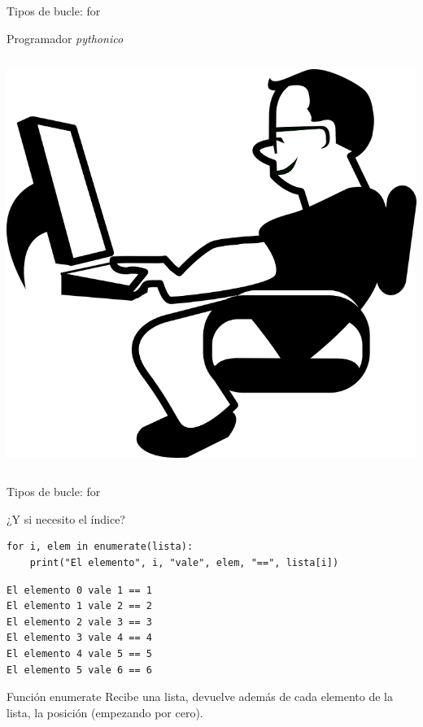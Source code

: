 \documentclass[bigger,unknownkeysallowed]{beamer}
\begin{document}
\begin{frame}[fragile,label={sec:org4d41cb9}]{Tipos de bucle: for}
\begin{block}{Programador \emph{pythonico}}
\begin{columns}
\begin{column}{0.3\columnwidth}
\begin{center}
\begin{center}
\includegraphics[width=.6\textwidth]{workingrelaxed.png}
\end{center}
\end{center}
\end{column}
\end{columns}
\end{block}
\end{frame}

\begin{frame}[fragile,label={sec:org6ac0d9c}]{Tipos de bucle: for}
 \begin{exampleblock}{¿Y si necesito el índice?}
\begin{verbatim}
for i, elem in enumerate(lista):
    print("El elemento", i, "vale", elem, "==", lista[i])
\end{verbatim}
\scriptsize
\begin{verbatim}
El elemento 0 vale 1 == 1
El elemento 1 vale 2 == 2
El elemento 2 vale 3 == 3
El elemento 3 vale 4 == 4
El elemento 4 vale 5 == 5
El elemento 5 vale 6 == 6
\end{verbatim}
\end{exampleblock}

\begin{block}{Función enumerate}
Recibe una lista, devuelve además de cada elemento de la lista, la posición (empezando por cero).
\end{block}
\end{frame}
\end{document}

